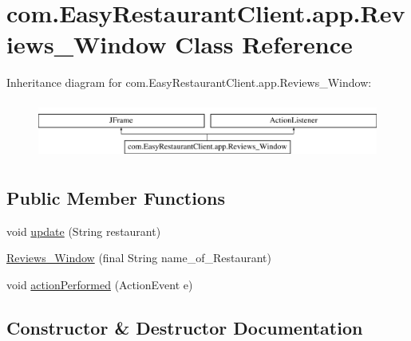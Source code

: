 \hypertarget{classcom_1_1_easy_restaurant_client_1_1app_1_1_reviews___window}{}\section{com.\+Easy\+Restaurant\+Client.\+app.\+Reviews\+\_\+\+Window Class Reference}
\label{classcom_1_1_easy_restaurant_client_1_1app_1_1_reviews___window}
Inheritance diagram for com.\+Easy\+Restaurant\+Client.\+app.\+Reviews\+\_\+\+Window\+:\begin{figure}[H]
\begin{center}
\leavevmode
\includegraphics[height=1.904762cm]{classcom_1_1_easy_restaurant_client_1_1app_1_1_reviews___window}
\end{center}
\end{figure}
\subsection*{Public Member Functions}
\begin{DoxyCompactItemize}
\item 
void \mbox{\hyperlink{classcom_1_1_easy_restaurant_client_1_1app_1_1_reviews___window_a519b9e93b666c9d63360397ae7d34b3d}{update}} (String restaurant)
\item 
\mbox{\hyperlink{classcom_1_1_easy_restaurant_client_1_1app_1_1_reviews___window_aca2dfe60f559c82bd25b555e272f484f}{Reviews\+\_\+\+Window}} (final String name\+\_\+of\+\_\+\+Restaurant)
\item 
void \mbox{\hyperlink{classcom_1_1_easy_restaurant_client_1_1app_1_1_reviews___window_a3458a1f79839fc76df4e209dc5a954bd}{action\+Performed}} (Action\+Event e)
\end{DoxyCompactItemize}


\subsection{Constructor \& Destructor Documentation}
\mbox{\label{classcom_1_1_easy_restaurant_client_1_1app_1_1_reviews___window_aca2dfe60f559c82bd25b555e272f484f}} 
